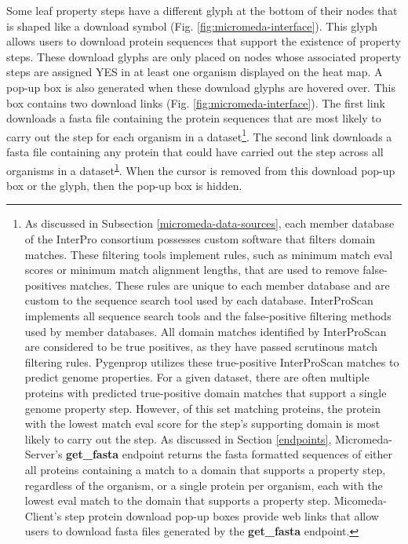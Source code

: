 \FloatBarrier
Some leaf property steps have a different glyph at the bottom of their nodes 
that is shaped like a download symbol (Fig. \ref{fig:micromeda-interface}). This 
glyph allows users to download protein sequences that support the existence of 
property steps. These download glyphs are only placed on nodes whose associated 
property steps are assigned YES in at least one organism displayed on the heat 
map. A pop-up box is also generated when these download glyphs are hovered over. 
This box contains two download links (Fig. \ref{fig:micromeda-interface}). The 
first link downloads a \gls{fasta} file containing the protein sequences that 
are most likely to carry out the step for each organism in a dataset\footnote{As 
discussed in Subsection \ref{micromeda-data-sources}, each member 
database of the InterPro consortium possesses custom software that filters 
domain matches. These filtering tools implement rules, such as minimum match 
\gls{eval} scores or minimum match alignment lengths, that are used to remove 
false-positives matches. These rules are unique to each member database and are 
custom to the sequence search tool used by each database. InterProScan 
implements all sequence search tools and the false-positive filtering methods 
used by member databases. All domain matches identified by InterProScan are 
considered to be true positives, as they have passed scrutinous match filtering 
rules. Pygenprop utilizes these true-positive InterProScan matches to predict 
genome properties. For a given dataset, there are often multiple proteins with 
predicted true-positive domain matches that support a single genome property 
step. However, of this set matching proteins, the protein with the lowest match 
\gls{eval} score for the step’s supporting domain is most likely to carry out 
the step. As discussed in Section \ref{endpoints}, Micromeda-Server’s 
\textbf{get\_fasta} endpoint returns the \gls{fasta} formatted sequences of 
either all proteins containing a match to a domain that supports a property 
step, regardless of the organism, or a single protein per organism, each with 
the lowest \gls{eval} match to the domain that supports a property step. 
Micomeda-Client’s step protein download pop-up boxes provide web links that 
allow users to download \gls{fasta} files generated by the \textbf{get\_fasta} 
endpoint.\label{protein-download-note}}. The second link downloads a \gls{fasta} 
file containing any protein that could have carried out the step across all 
organisms in a dataset\textsuperscript{\ref{protein-download-note}}. When the 
cursor is removed from this download pop-up box or the glyph, then the pop-up 
box is hidden.

